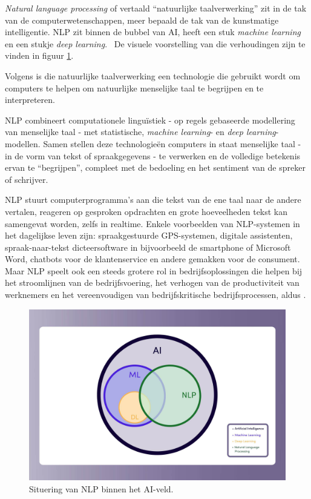 \textit{Natural language processing} of vertaald ``natuurlijke taalverwerking'' zit in de tak van de computerwetenschappen, meer bepaald de tak van de kunstmatige intelligentie. NLP zit binnen de bubbel van AI, heeft een stuk \textit{machine learning} en een stukje \textit{deep learning}.~\autocite{Kleinings2022} De visuele voorstelling van die verhoudingen zijn te vinden in figuur \ref{fig:nlp_field}.

Volgens \textcite{Kleinings2022} is die natuurlijke taalverwerking een technologie die gebruikt wordt om computers te helpen om natuurlijke menselijke taal te begrijpen en te interpreteren.

NLP combineert computationele linguïstiek - op regels gebaseerde modellering van menselijke taal - met statistische, \textit{machine learning}- en \textit{deep learning}-modellen. Samen stellen deze technologieën computers in staat menselijke taal - in de vorm van tekst of spraakgegevens - te verwerken en de volledige betekenis ervan te ``begrijpen'', compleet met de bedoeling en het sentiment van de spreker of schrijver.~\autocite{IBMCloudEducation2021}

NLP stuurt computerprogramma's aan die tekst van de ene taal naar de andere vertalen, reageren op gesproken opdrachten en grote hoeveelheden tekst kan samengevat worden, zelfs in realtime. Enkele voorbeelden van NLP-systemen in het dagelijkse leven zijn: spraakgestuurde GPS-systemen, digitale assistenten, spraak-naar-tekst dicteersoftware in bijvoorbeeld de smartphone of Microsoft Word, chatbots voor de klantenservice en andere gemakken voor de consument. Maar NLP speelt ook een steeds grotere rol in bedrijfsoplossingen die helpen bij het stroomlijnen van de bedrijfsvoering, het verhogen van de productiviteit van werknemers en het vereenvoudigen van bedrijfskritische bedrijfsprocessen, aldus \textcite{IBMCloudEducation2021}.

\begin{figure}
    \centering
    \includegraphics[width=.8\textwidth]{./img/nlp_field_ai.jpeg}
    \caption{\label{fig:nlp_field} Situering van NLP binnen het AI-veld.~\autocite{Kleinings2022}}
\end{figure}

